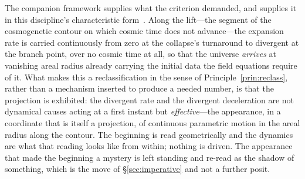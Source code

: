\documentclass[11pt,a4paper]{article}
\begin{document}
The companion framework supplies what the criterion demanded, and supplies it in this discipline's
characteristic form~\cite{JanzenCRframework}. Along the lift---the segment of the cosmogenetic contour on which
cosmic time does not advance---the expansion rate is carried continuously from zero at the collapse's turnaround
to divergent at the branch point, over no cosmic time at all, so that the universe \emph{arrives} at vanishing
areal radius already carrying the initial data the field equations require of it. What makes this a
reclassification in the sense of Principle~\ref{prin:reclass}, rather than a mechanism inserted to produce a needed
number, is that the projection is exhibited: the divergent rate and the divergent deceleration are not dynamical
causes acting at a first instant but \emph{effective}---the appearance, in a coordinate that is itself a
projection, of continuous parametric motion in the areal radius along the contour. The beginning is read
geometrically and the dynamics are what that reading looks like from within; nothing is driven. The appearance
that made the beginning a mystery is left standing and re-read as the shadow of something, which is the move of
\S\ref{sec:imperative} and not a further posit.
\end{document}
